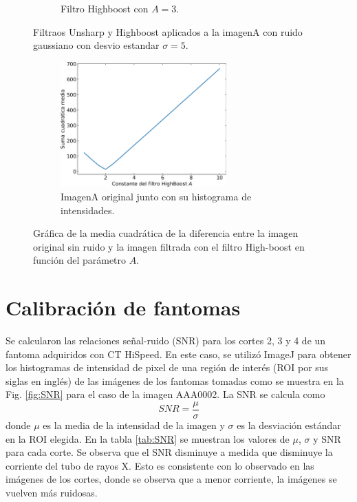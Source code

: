 \documentclass[letterpaper,12pt]{article}
\theoremstyle{plain}
\begin{document}
\begin{figure}[h]
\begin{subfigure}[h]{0.32\linewidth}
            \caption{Filtro Highboost con $A=3$.} 
         \end{subfigure}
    \caption{Filtraos Unsharp y Highboost aplicados a la imagenA con ruido gaussiano con desvio estandar $\sigma =5$.}
    \label{fig:highunsharp}
\end{figure}

\begin{figure}[h]
    \centering
         \begin{subfigure}[h]{\linewidth}
            \centering
            \includegraphics[width=0.7\textwidth]{Figuras/Highboost_plot.png}
            \caption{ImagenA original junto con su histograma de intensidades.} 
         \end{subfigure}
    \caption{Gráfica de la media cuadrática de la diferencia entre la imagen original sin ruido y la imagen filtrada con el filtro High-boost en función del parámetro $A$.}
    \label{fig:plot_highboost}
\end{figure}

\section{Calibración de fantomas\label{sec:ej7}}

\vspace{0.3cm}

Se calcularon las relaciones señal-ruido (SNR) para los cortes 2, 3 y 4 de un fantoma adquiridos con CT HiSpeed. En este caso, se utilizó ImageJ para obtener los histogramas de intensidad de pixel de una región de interés (ROI por sus siglas en inglés) de las imágenes de los fantomas tomadas como se muestra en la Fig. \ref{fig:SNR} para el caso de la imagen AAA0002. La SNR se calcula como 
\begin{equation}
    SNR = \frac{\mu}{\sigma}
\end{equation}
donde $\mu$ es la media de la intensidad de la imagen y $\sigma$ es la desviación estándar en la ROI elegida. En la tabla \ref{tab:SNR} se muestran los valores de $\mu$, $\sigma$ y SNR para cada corte. Se observa que el SNR disminuye a medida que disminuye la corriente del tubo de rayos X. Esto es consistente con lo observado en las imágenes de los cortes, donde se observa que a menor corriente, la imágenes se vuelven más ruidosas.
\end{document}
